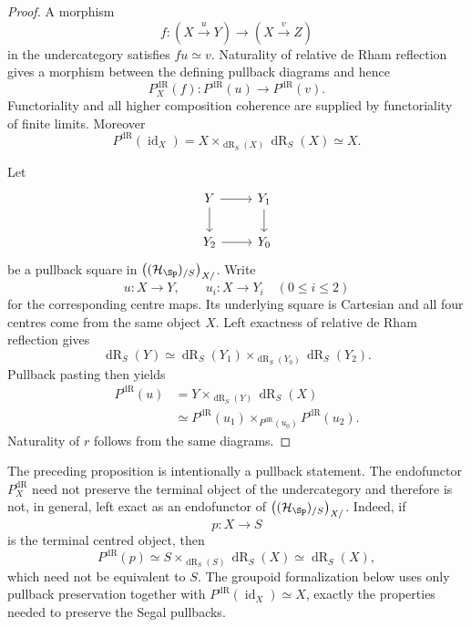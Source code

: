 \begin{proof}
A morphism
\[
    f:(X\xrightarrow{u}Y)\longrightarrow(X\xrightarrow{v}Z)
\]
in the undercategory satisfies $fu\simeq v$.  Naturality of relative de Rham
reflection gives a morphism between the defining pullback diagrams and hence
\[
    P_X^{\mathrm{dR}}(f):P^{\mathrm{dR}}(u)\longrightarrow P^{\mathrm{dR}}(v).
\]
Functoriality and all higher composition coherence are supplied by
functoriality of finite limits.  Moreover
\[
    P^{\mathrm{dR}}(\operatorname{id}_X)
    =
    X\times_{\operatorname{dR}_S(X)}\operatorname{dR}_S(X)
    \simeq X.
\]

Let
\[
\begin{tikzcd}
Y \arrow[r] \arrow[d] &
Y_1 \arrow[d]\\
Y_2 \arrow[r] &
Y_0
\end{tikzcd}
\]
be a pullback square in $\bigl((\mathcal H_{\Sp})_{/S}\bigr)_{X/}$.
Write
\[
    u:X\to Y,
    \qquad
    u_i:X\to Y_i\quad(0\leq i\leq2)
\]
for the corresponding centre maps.  Its underlying square is Cartesian and
all four centres come from the same object $X$.  Left exactness of relative
de Rham reflection gives
\[
    \operatorname{dR}_S(Y)
    \simeq
    \operatorname{dR}_S(Y_1)
    \times_{\operatorname{dR}_S(Y_0)}
    \operatorname{dR}_S(Y_2).
\]
Pullback pasting then yields
\[
\begin{aligned}
    P^{\mathrm{dR}}(u)
    &=
    Y\times_{\operatorname{dR}_S(Y)}\operatorname{dR}_S(X)\\
    &\simeq
    P^{\mathrm{dR}}(u_1)
    \times_{P^{\mathrm{dR}}(u_0)}
    P^{\mathrm{dR}}(u_2).
\end{aligned}
\]
Naturality of $r$ follows from the same diagrams.
\end{proof}

\begin{remark}
\label{rem:centred-formalization-not-left-exact}
The preceding proposition is intentionally a pullback statement.  The
endofunctor $P_X^{\mathrm{dR}}$ need not preserve the terminal object of the undercategory
and therefore is not, in general, left exact as an endofunctor of
$\bigl((\mathcal H_{\Sp})_{/S}\bigr)_{X/}$.  Indeed, if
\[
    p:X\to S
\]
is the terminal centred object, then
\[
    P^{\mathrm{dR}}(p)
    \simeq
    S\times_{\operatorname{dR}_S(S)}\operatorname{dR}_S(X)
    \simeq
    \operatorname{dR}_S(X),
\]
which need not be equivalent to $S$.  The groupoid formalization below uses
only pullback preservation together with
$P^{\mathrm{dR}}(\operatorname{id}_X)\simeq X$, exactly the properties needed to
preserve the Segal pullbacks.
\end{remark}


